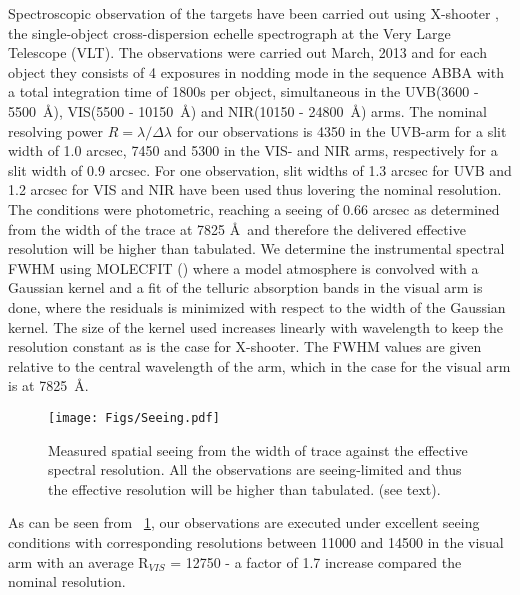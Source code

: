 \documentclass{aa}    %
\newcommand{\figref}[1]{\ref{fig:#1}}
\newcommand{\Fig}[1]{\figurename~\figref{#1}}
\newcommand{\fig}[1]{\Fig{#1}}
\newcommand{\figlabel}[1]{\label{fig:#1}}
\begin{document}
Spectroscopic observation of the targets have been carried out using X-shooter \citep{Vernet2011}, the single-object cross-dispersion echelle spectrograph at the Very Large Telescope (VLT). The observations were carried out March, 2013 and for each object they consists of 4 exposures in nodding mode in the sequence ABBA with a total integration time of 1800s per object, simultaneous in the UVB(3600 - 5500~\AA), VIS(5500 - 10150~\AA)  and NIR(10150 - 24800~\AA) arms. The nominal resolving power $R = \lambda / \Delta \lambda$ for our observations is 4350 in the UVB-arm for a slit width of 1.0 arcsec, 7450 and 5300 in the VIS- and NIR arms, respectively for a slit width of 0.9 arcsec. For one observation, slit widths of 1.3 arcsec for UVB and 1.2 arcsec for VIS and NIR have been used thus lovering the nominal resolution. The conditions were photometric, reaching a seeing of 0.66 arcsec as determined from the width of the trace at 7825 \AA~and therefore the delivered effective resolution will be higher than tabulated. We determine the instrumental spectral FWHM using MOLECFIT (\cite{Smette2015, Kausch2015}) where a model atmosphere is convolved with a Gaussian kernel and a fit of the telluric absorption bands in the visual arm is done, where the residuals is minimized with respect to the width of the Gaussian kernel. The size of the kernel used increases linearly with wavelength to keep the resolution constant as is the case for X-shooter. The FWHM values are given relative to the central wavelength of the arm, which in the case for the visual arm is at 7825~\AA. 


\begin{figure}[hbtp]
  \centering
  \texttt{[image: Figs/Seeing.pdf]}
  \caption[]{Measured spatial seeing from the width of trace against the effective spectral resolution. All the observations are seeing-limited and thus the effective resolution will be higher than tabulated. (see text).}
\figlabel{seeing}
\end{figure}



As can be seen from \fig{seeing}, our observations are executed under excellent seeing conditions with corresponding resolutions between 11000 and 14500 in the visual arm with an average R$_{VIS}$ = 12750 - a factor of 1.7 increase compared the nominal resolution. 
\end{document}
